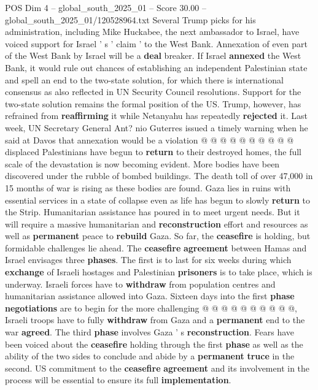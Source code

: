 \begin{textsample}{POS Dim 4 – global\_south\_2025\_01 – Score 30.00 – global\_south\_2025\_01/120528964.txt}
Several Trump picks for his administration, including Mike Huckabee, the next ambassador to Israel, have voiced support for Israel ' s ' claim ' to the West Bank.
Annexation of even part of the West Bank by Israel will be a \textbf{deal} breaker.
If Israel \textbf{annexed} the West Bank, it would rule out chances of establishing an independent Palestinian state and spell an end to the two-state solution, for which there is international consensus as also reflected in UN Security Council resolutions.
Support for the two-state solution remains the formal position of the US.
Trump, however, has refrained from \textbf{reaffirming} it while Netanyahu has repeatedly \textbf{rejected} it.
Last week, UN Secretary General Ant? nio Guterres issued a timely warning when he said at Davos that annexation would be a violation @ @ @ @ @ @ @ @ @ @ displaced Palestinians have begun to \textbf{return} to their destroyed homes, the full scale of the devastation is now becoming evident.
More bodies have been discovered under the rubble of bombed buildings.
The death toll of over 47,000 in 15 months of war is rising as these bodies are found.
Gaza lies in ruins with essential services in a state of collapse even as life has begun to slowly \textbf{return} to the Strip.
Humanitarian assistance has poured in to meet urgent needs.
But it will require a massive humanitarian and \textbf{reconstruction} effort and resources as well as \textbf{permanent} peace to \textbf{rebuild} Gaza.
So far, the \textbf{ceasefire} is holding, but formidable challenges lie ahead.
The \textbf{ceasefire} \textbf{agreement} between Hamas and Israel envisages three \textbf{phases}.
The first is to last for six weeks during which \textbf{exchange} of Israeli hostages and Palestinian \textbf{prisoners} is to take place, which is underway.
Israeli forces have to \textbf{withdraw} from population centres and humanitarian assistance allowed into Gaza.
Sixteen days into the first \textbf{phase} \textbf{negotiations} are to begin for the more challenging @ @ @ @ @ @ @ @ @ @, Israeli troops have to fully \textbf{withdraw} from Gaza and a \textbf{permanent} end to the war \textbf{agreed}.
The third \textbf{phase} involves Gaza ' s \textbf{reconstruction}.
Fears have been voiced about the \textbf{ceasefire} holding through the first \textbf{phase} as well as the ability of the two sides to conclude and abide by a \textbf{permanent} \textbf{truce} in the second.
US commitment to the \textbf{ceasefire} \textbf{agreement} and its involvement in the process will be essential to ensure its full \textbf{implementation}.

\end{textsample}
